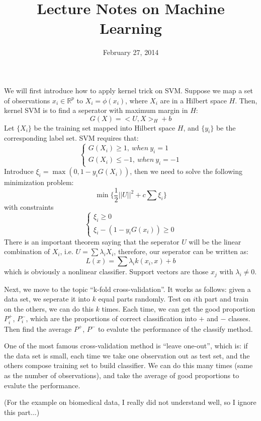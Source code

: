 \documentclass{article}
\title{Lecture Notes on Machine Learning}
\date{February 27, 2014}
\begin{document}
\maketitle

We will first introduce how to apply kernel trick on SVM. Suppose we map a set of observations $x_{i} \in \mathbb{R}^{p}$ to $X_{i} = \phi(x_{i})$,
where $X_{i}$ are in a Hilbert space $H$. Then, kernel SVM is to find a seperator with maximum margin in $H$:
\begin{equation*}
 G(X) = <U,X>_{H} + b
\end{equation*}
Let $\{X_{i}\}$ be the training set mapped into Hilbert space $H$, and $\{y_{i}\}$ be the corresponding label set. SVM requires that:
\begin{equation*}
 \begin{cases}
  G(X_{i}) \geq 1, \ when \ y_{i}=1 \\
  G(X_{i}) \leq -1, \ when \ y_{i}=-1
   \end{cases}
\end{equation*}
Introduce $\xi_{i}=\max(0, 1-y_{i}G(X_{i}))$, then we need to solve the following minimization problem:
\begin{equation*}
 \min\{\frac{1}{2}||U||^{2} + c\sum \xi_{i}\}
\end{equation*}
with constraints
\begin{equation*}
 \begin{cases}
  \xi_{i} \geq 0 \\
  \xi_{i}-(1-y_{i}G(x_{i})) \geq 0
 \end{cases}
\end{equation*}
There is an important theorem saying that the seperator $U$ will be the linear combination of $X_{i}$, i.e. $U=\sum \lambda_{i}X_{i}$, therefore, our
seperator can be written as:
\begin{equation*}
 L(x) = \sum \lambda_{i} k(x_{i},x) + b 
\end{equation*}
which is obviously a nonlinear classifier. Support vectors are those $x_{j}$ with $\lambda_{i}\neq0$.

Next, we move to the topic ``k-fold cross-validation''. It works as follows: given a data set, we seperate it into $k$ equal parts randomly. Test
on $i$th part and train on the others, we can do this $k$ times. Each time, we can get the good proportion $P_{i}^{+}$, $P_{i}^{-}$, which are the
proportions of correct classification into $+$ and $-$ classes. Then find the average $P^{+}$, $P^{-}$ to evalute the performance of the classify
method.

One of the most famous cross-validation method is ``leave one-out'', which is: if the data set is small, each time we take one observation out as
test set, and the others compose training set to build classifier. We can do this many times (same as the number of observations), and take the
average of good proportions to evalute the performance.

(For the example on biomedical data, I really did not understand well, so I ignore this part...)
\end{document}
